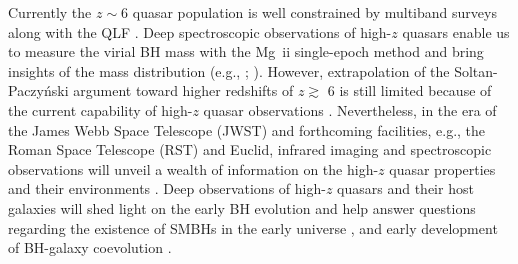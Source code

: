 \documentclass[twocolumn, twocolappendix]{aastex63}
\begin{document}
\begin{CJK*}{UTF8}{gbsn}
Currently the $z\sim 6$ quasar population is well constrained by multiband surveys
\citep{2008AJ....135.1057J,2010AJ....139..906W,2016arXiv161205560C,2018PASJ...70S..35M,2019ApJ...883..183M,2019AJ....157..168D}
along with the QLF \citep[e.g.,][]{2015ApJ...798...28K,2016ApJ...833..222J,2017ApJ...847L..15O,2018ApJ...869..150M}.
Deep spectroscopic observations of high-$z$ quasars enable us to measure the virial BH mass 
with the Mg~{\sc ii} single-epoch method and bring insights of the mass distribution
(e.g., \citealt{2007AJ....134.1150J,2007ApJ...669...32K,2010AJ....140..546W};
\citealt{2018Natur.553..473B,2019ApJ...880...77O,2019ApJ...873...35S}). 
However, extrapolation of the Soltan-Paczy{\'n}ski argument toward higher redshifts of $z\gtrsim$ 6 is still limited 
because of the current capability of high-$z$ quasar observations 
\citep{2013ApJ...768..105M,2016ApJ...829...33Y,2019ApJ...884...30W,2019BAAS...51c.121F}.
Nevertheless, in the era of the James Webb Space Telescope (JWST) and forthcoming facilities,
e.g., the Roman Space Telescope (RST) and Euclid,
infrared imaging and spectroscopic observations will unveil a wealth of information on the
high-$z$ quasar properties and their environments 
\citep{2019BAAS...51c..45R, 2019arXiv190205569A, 2011arXiv1110.3193L}. 
Deep observations of high-$z$ quasars and their host galaxies will shed light on the early BH evolution and help 
answer questions regarding the existence of SMBHs in the early universe \citep{2012Sci...337..544V,2013ASSL..396..293H,2020ARA&A..58...27I}, 
and early development of BH-galaxy coevolution 
\citep[e.g.,][]{2013ApJ...773...44W,2017ApJ...851L...8V,2021ApJ...914...36I,2022ApJ...927..237I,2022MNRAS.511.3751H}.




\end{CJK*}
\end{document}
